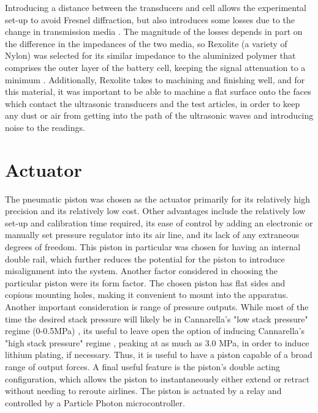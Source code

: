 Introducing a distance between the transducers and cell allows the experimental set-up to avoid Fresnel diffraction, but also introduces some losses due to the change in transmission media . The magnitude of the losses depends in part on the difference in the impedances of the two media, so Rexolite (a variety of Nylon) was selected for its similar impedance to the aluminized polymer that comprises the outer layer of the battery cell, keeping the signal attenuation to a minimum . 
Additionally, Rexolite takes to machining and finishing well, and for this material, it was important to be able to machine a flat surface onto the faces which contact the ultrasonic transducers and the test articles, in order to keep any dust or air from getting into the path of the ultrasonic waves and introducing noise to the readings.
 
\section{Actuator}
The pneumatic piston was chosen as the actuator primarily for its relatively high precision and its relatively low cost. Other advantages include the relatively low set-up and calibration time required, its ease of control by adding an electronic or manually set pressure regulator into its air line, and its lack of any extraneous degrees of freedom. This piston in particular was chosen for having an internal double rail, which further reduces the potential for the piston to introduce misalignment into the system. Another factor considered in choosing the particular piston were its form factor. The chosen piston has flat sides and copious mounting holes, making it convenient to mount into the apparatus. Another important consideration is range of pressure outputs. While most of the time the desired stack pressure will likely be in Cannarella's "low stack pressure" regime (0-0.5MPa) \cite{STACK-STRESS}, its useful to leave open the option of inducing Cannarella's "high stack pressure" regime \cite{STACK-STRESS}, peaking at as much as 3.0 MPa, in order to induce lithium plating, if necessary.  Thus, it is useful to have a piston capable of a broad range of output forces. A final useful feature is the piston's double acting configuration, which allows the piston to instantaneously either extend or retract without needing to reroute airlines. The piston is actuated by a relay and controlled by a Particle Photon microcontroller.


